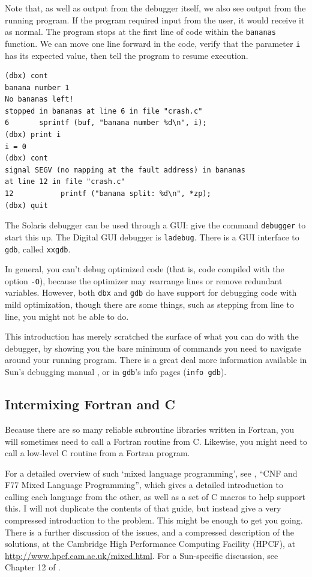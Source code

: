 \documentclass[11pt,oneside,chapters]{starlink}
\begin{document}
Note that, as well as output from the debugger itself, we
also see output from the running program.  If the program
required input from the user, it would receive it as
normal.  The program stops at the first line of code
within the \texttt{bananas} function.  We can move one
line forward in the code, verify that the parameter
\texttt{i} has its expected value, then tell the
program to resume execution.

\begin{verbatim}
(dbx) cont
banana number 1
No bananas left!
stopped in bananas at line 6 in file "crash.c"
6       sprintf (buf, "banana number %d\n", i);
(dbx) print i
i = 0
(dbx) cont
signal SEGV (no mapping at the fault address) in bananas
at line 12 in file "crash.c"
12           printf ("banana split: %d\n", *zp);
(dbx) quit
\end{verbatim}

The Solaris debugger can be used through a GUI: give the
command \texttt{debugger} to start this up.  The Digital
GUI debugger is \texttt{ladebug}.  There is a GUI
interface to \texttt{gdb}, called \texttt{xxgdb}.

In general, you can't debug optimized code (that is, code
compiled with the option \texttt{-O}), because the
optimizer may rearrange lines or remove redundant
variables.  However, both \texttt{dbx} and
\texttt{gdb} do have support for debugging code with
mild optimization, though there are some things, such as
stepping from line to line, you might not be able to do.

This introduction has merely scratched the surface of
what you can do with the debugger, by showing you the bare
minimum of commands you need to navigate around your
running program.  There is a great deal more information
available in Sun's debugging manual
\citep{sundebug}, or in \texttt{gdb}'s
info pages (\texttt{info gdb}).

\subsection{Intermixing Fortran and C}
\label{s:candf}

Because there are so many reliable subroutine libraries
written in Fortran, you will sometimes need to call a
Fortran routine from C.  Likewise, you might need to call
a low-level C routine from a Fortran program.

For a detailed overview of such `mixed language
programming', see ,
``CNF and F77 Mixed Language Programming'', which
gives a detailed introduction to calling each language
from the other, as well as a set of C macros to help
support this.  I will not duplicate the contents of that
guide, but instead give a very compressed introduction to
the problem.  This might be enough to get you going.
There is a further discussion of the issues, and a
compressed description of the solutions, at the Cambridge
High Performance Computing Facility (HPCF), at
\url{http://www.hpcf.cam.ac.uk/mixed.html}.  For a
Sun-specific discussion, see Chapter 12 of
\citet{sunf77}.
\end{document}
